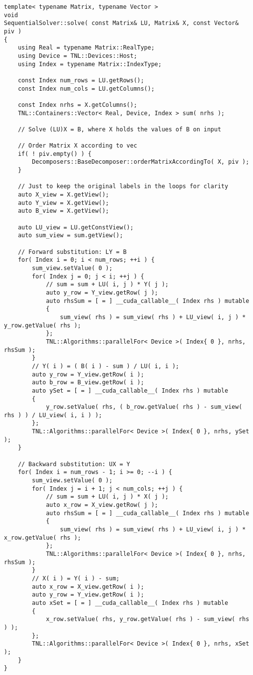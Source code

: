 \begin{lstlisting}[caption={Excerpt from the implementation of SSPP.
The code has been slightly modified for brevity, for example, the checks for appropriate sizing of matrices and vectors have been removed.},label={Listing:SSPP-implementation-excerpt}]
template< typename Matrix, typename Vector >
void
SequentialSolver::solve( const Matrix& LU, Matrix& X, const Vector& piv )
{
	using Real = typename Matrix::RealType;
	using Device = TNL::Devices::Host;
	using Index = typename Matrix::IndexType;
	
	const Index num_rows = LU.getRows();
	const Index num_cols = LU.getColumns();
	
	const Index nrhs = X.getColumns();
	TNL::Containers::Vector< Real, Device, Index > sum( nrhs );
	
	// Solve (LU)X = B, where X holds the values of B on input
	
	// Order Matrix X according to vec
	if( ! piv.empty() ) {
		Decomposers::BaseDecomposer::orderMatrixAccordingTo( X, piv );
	}
	
	// Just to keep the original labels in the loops for clarity
	auto X_view = X.getView();
	auto Y_view = X.getView();
	auto B_view = X.getView();
	
	auto LU_view = LU.getConstView();
	auto sum_view = sum.getView();
	
	// Forward substitution: LY = B
	for( Index i = 0; i < num_rows; ++i ) {
		sum_view.setValue( 0 );
		for( Index j = 0; j < i; ++j ) {
			// sum = sum + LU( i, j ) * Y( j );
			auto y_row = Y_view.getRow( j );
			auto rhsSum = [ = ] __cuda_callable__( Index rhs ) mutable
			{
				sum_view( rhs ) = sum_view( rhs ) + LU_view( i, j ) * y_row.getValue( rhs );
			};
			TNL::Algorithms::parallelFor< Device >( Index{ 0 }, nrhs, rhsSum );
		}
		// Y( i ) = ( B( i ) - sum ) / LU( i, i );
		auto y_row = Y_view.getRow( i );
		auto b_row = B_view.getRow( i );
		auto ySet = [ = ] __cuda_callable__( Index rhs ) mutable
		{
			y_row.setValue( rhs, ( b_row.getValue( rhs ) - sum_view( rhs ) ) / LU_view( i, i ) );
		};
		TNL::Algorithms::parallelFor< Device >( Index{ 0 }, nrhs, ySet );
	}
	
	// Backward substitution: UX = Y
	for( Index i = num_rows - 1; i >= 0; --i ) {
		sum_view.setValue( 0 );
		for( Index j = i + 1; j < num_cols; ++j ) {
			// sum = sum + LU( i, j ) * X( j );
			auto x_row = X_view.getRow( j );
			auto rhsSum = [ = ] __cuda_callable__( Index rhs ) mutable
			{
				sum_view( rhs ) = sum_view( rhs ) + LU_view( i, j ) * x_row.getValue( rhs );
			};
			TNL::Algorithms::parallelFor< Device >( Index{ 0 }, nrhs, rhsSum );
		}
		// X( i ) = Y( i ) - sum;		
		auto x_row = X_view.getRow( i );
		auto y_row = Y_view.getRow( i );
		auto xSet = [ = ] __cuda_callable__( Index rhs ) mutable
		{
			x_row.setValue( rhs, y_row.getValue( rhs ) - sum_view( rhs ) );
		};
		TNL::Algorithms::parallelFor< Device >( Index{ 0 }, nrhs, xSet );
	}
}
\end{lstlisting}




